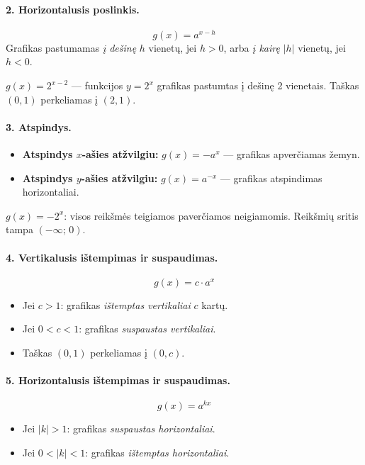 \paragraph{2. Horizontalusis poslinkis.}
\[
    g(x) = a^{x - h}
\]
Grafikas pastumamas \textit{į dešinę} $h$ vienetų, jei $h > 0$, arba
\textit{į kairę} $|h|$ vienetų, jei $h < 0$.

\begin{example}
$g(x) = 2^{x-2}$ --- funkcijos $y = 2^x$ grafikas pastumtas į dešinę 2 vienetais.
Taškas $(0, 1)$ perkeliamas į $(2, 1)$.
\end{example}

\paragraph{3. Atspindys.}
\begin{itemize}
    \item \textbf{Atspindys $x$\nobreakdash-ašies atžvilgiu:}
          $g(x) = -a^x$ --- grafikas apverčiamas žemyn.
    \item \textbf{Atspindys $y$\nobreakdash-ašies atžvilgiu:}
          $g(x) = a^{-x}$ --- grafikas atspindimas horizontaliai.
\end{itemize}

\begin{example}
$g(x) = -2^x$: visos reikšmės teigiamos paverčiamos neigiamomis.
Reikšmių sritis tampa $(-\infty;\, 0)$.
\end{example}

\paragraph{4. Vertikalusis ištempimas ir suspaudimas.}
\[
    g(x) = c \cdot a^x
\]
\begin{itemize}
    \item Jei $c > 1$: grafikas \textit{ištemptas vertikaliai} $c$ kartų.
    \item Jei $0 < c < 1$: grafikas \textit{suspaustas vertikaliai}.
    \item Taškas $(0, 1)$ perkeliamas į $(0, c)$.
\end{itemize}

\paragraph{5. Horizontalusis ištempimas ir suspaudimas.}
\[
    g(x) = a^{kx}
\]
\begin{itemize}
    \item Jei $|k| > 1$: grafikas \textit{suspaustas horizontaliai}.
    \item Jei $0 < |k| < 1$: grafikas \textit{ištemptas horizontaliai}.
\end{itemize}


